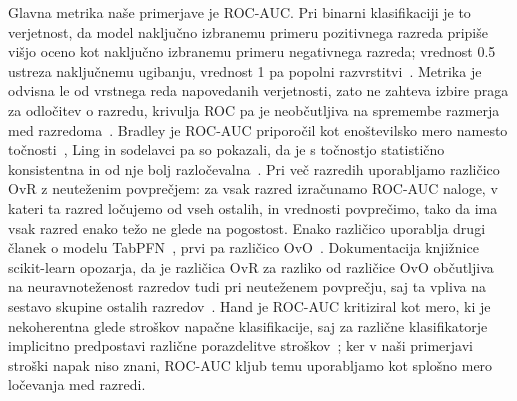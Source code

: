 \documentclass[a4paper,12pt,openright]{book}
\begin{document}
Glavna metrika naše primerjave je ROC-AUC. Pri binarni klasifikaciji je to
verjetnost, da model naključno izbranemu primeru pozitivnega razreda pripiše
višjo oceno kot naključno izbranemu primeru negativnega razreda; vrednost
\num{0.5} ustreza naključnemu ugibanju, vrednost 1 pa popolni
razvrstitvi~\cite{fawcett2006introduction}. Metrika je odvisna le od vrstnega
reda napovedanih verjetnosti, zato ne zahteva izbire praga za odločitev o
razredu, krivulja ROC pa je neobčutljiva na spremembe razmerja med
razredoma~\cite{fawcett2006introduction}. Bradley je ROC-AUC priporočil kot
enoštevilsko mero namesto točnosti~\cite{bradley1997use}, Ling in sodelavci pa
so pokazali, da je s točnostjo statistično konsistentna in od nje bolj
razločevalna~\cite{ling2003auc}. Pri več razredih uporabljamo različico OvR z
neuteženim povprečjem: za vsak razred izračunamo ROC-AUC naloge, v kateri ta
razred ločujemo od vseh ostalih, in vrednosti povprečimo, tako da ima vsak
razred enako težo ne glede na pogostost. Enako različico uporablja drugi
članek o modelu TabPFN~\cite{hollmann2025tabpfn}, prvi pa različico
OvO~\cite{hollmann2023tabpfn,hand2001simple}. Dokumentacija knjižnice
scikit-learn opozarja, da je različica OvR za razliko od različice OvO
občutljiva na neuravnoteženost razredov tudi pri neuteženem povprečju, saj ta
vpliva na sestavo skupine ostalih razredov~\cite{sklearndocsroc}. Hand je
ROC-AUC kritiziral kot mero, ki je nekoherentna glede stroškov napačne
klasifikacije, saj za različne klasifikatorje implicitno predpostavi različne
porazdelitve stroškov~\cite{hand2009measuring}; ker v naši primerjavi stroški
napak niso znani, ROC-AUC kljub temu uporabljamo kot splošno mero ločevanja med
razredi.
\end{document}

